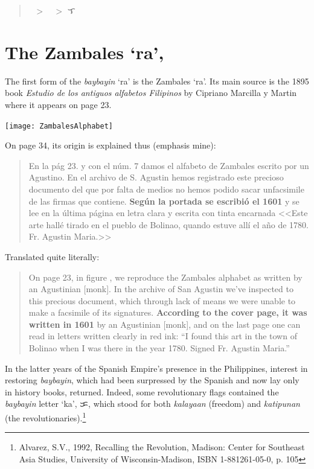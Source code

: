 \documentclass[a4paper,pagesize,openany,14pt,parskip=never]{scrbook}
\newcommand{\≈}{$\approx$}
\begin{document}
\begin{quote}
    {\baybayin ᜍ} $>$ {\baybayinh ᜍ} $>$ {\baybayin ᜎ}
\end{quote}


\section{The Zambales `ra', {\baybayinh ᜍ}}

The first form of the {\em baybayin} `ra' is the Zambales `ra'. Its main source is the 1895 book {\em Estudio de los antiguos alfabetos Filipinos} by Cipriano Marcilla y Martin where it appears on page 23. 

\texttt{[image: ZambalesAlphabet]}

On page 34, its origin is explained thus (emphasis mine):

\begin{quote}
    En la p\'ag 23. y con el n\'um. 7 damos el alfabeto de Zambales escrito por un Agustino. En el archivo de S. Agustin hemos registrado este precioso documento del que por falta de medios no hemos podido sacar unfacsimile de las firmas que contiene. {\bfseries Seg\'un la portada se escribi\'o el 1601} y se lee en la \'ultima p\'agina en letra clara y escrita con tinta encarnada <<Este arte hall\'e tirado en el pueblo de Bolinao, quando estuve all\'i el a\~no de 1780. Fr. Agustin Maria.>>
\end{quote}

Translated quite literally:

\begin{quote}
    On page 23, in figure , we reproduce the Zambales alphabet as written by an Agustinian [monk]. In the archive of San Agustin we've inspected to this precious document, which through lack of means we were unable to make a facsimile of its signatures. {\bfseries According to the cover page, it was written in 1601} by an Agustinian [monk], and on the last page one can read in letters written clearly in red ink: ``I found this art in the town of Bolinao when I was there in the year 1780. Signed Fr. Agustin Maria.''
\end{quote}

In the latter years of the Spanish Empire's presence in the Philippines, interest in restoring {\em baybayin}, which had been surpressed by the Spanish and now lay only in history books, returned. Indeed, some revolutionary flags contained the {\em baybayin} letter `ka', {\baybayin ᜃ}, which stood for both {\em kalayaan} (freedom) and {\em katipunan} (the revolutionaries).\footnote{Alvarez, S.V., 1992, Recalling the Revolution, Madison: Center for Southeast Asia Studies, University of Wisconsin-Madison, ISBN 1-881261-05-0, p. 105} 
\end{document}
